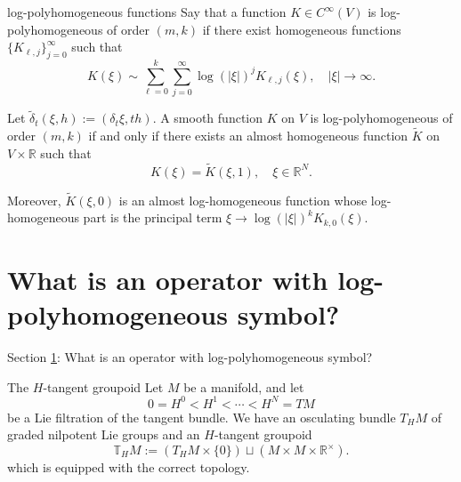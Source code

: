 \documentclass{beamer}
\numberwithin{equation}{section}
\theoremstyle{plain}
\theoremstyle{plain}
\theoremstyle{definition}
\theoremstyle{plain}
\theoremstyle{plain}
\theoremstyle{definition}
\newcommand{\Rl}{\mathbb{R}}
\newcommand{\Tb}{\mathbb{T}}
\begin{document}
\begin{frame}{log-polyhomogeneous functions}
    Say that a function $K\in C^{\infty}(V)$ is log-polyhomogeneous of order $(m,k)$ if there exist homogeneous functions $\{K_{\ell,j}\}_{j=0}^\infty$ such that
    \[
        K(\xi) \sim\sum_{\ell=0}^k \sum_{j=0}^\infty \log(|\xi|)^jK_{\ell,j}(\xi),\quad |\xi|\to\infty.
    \]
    \begin{theorem}
        Let $\widetilde{\delta}_t(\xi,h) := (\delta_t\xi,th).$ A smooth function $K$ on $V$ is log-polyhomogeneous of order $(m,k)$ if and only if there exists an almost homogeneous function $\widetilde{K}$ on $V\times \Rl$ such that
        \[
            K(\xi) = \widetilde{K}(\xi,1),\quad\xi\in \Rl^N.
        \]
    \end{theorem}
    Moreover, $\widetilde{K}(\xi,0)$ is an almost log-homogeneous function whose log-homogeneous part is the principal term $\xi\to \log(|\xi|)^{k}K_{k,0}(\xi).$
\end{frame}

\section{What is an operator with log-polyhomogeneous symbol?}\label{operator_section}

\begin{frame}
    \huge{Section \ref{operator_section}: What is an operator with log-polyhomogeneous symbol?}
\end{frame}

\begin{frame}{The $H$-tangent groupoid}
    Let $M$ be a manifold, and let
    \[
        0=H^0 < H^1 <\cdots < H^N=TM
    \]
    be a Lie filtration of the tangent bundle. We have an osculating bundle $T_HM$ of graded nilpotent Lie groups and an $H$-tangent groupoid
    \[
        \Tb_HM := (T_HM\times \{0\})\sqcup (M\times M\times \Rl^{\times}).
    \]
    which is equipped with the correct topology.
\end{frame}
\end{document}

